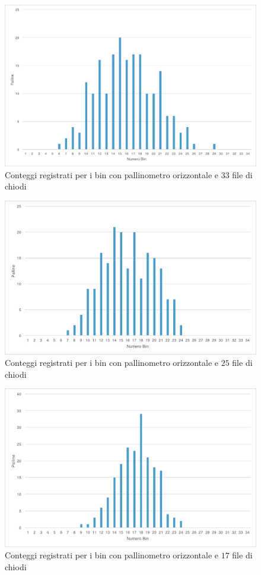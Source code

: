 \documentclass[10pt,oneside,a4paper]{article}
\begin{document}
\begin{figure}[H]
\caption{Conteggi registrati per i bin con pallinometro orizzontale e $33$ file di chiodi}
\label{fig:palli_orizzontale_33}
\centering
\includegraphics[scale=0.5]{pallinometro_dritto_foro1.png}
\end{figure}
\begin{figure}[H]
\caption{Conteggi registrati per i bin con pallinometro orizzontale e $25$ file di chiodi}
\label{fig:palli_orizzontale_25}
\centering
\includegraphics[scale=0.55]{pallinometro_dritto_foro2.png}
\end{figure}
\begin{figure}[H]
\caption{Conteggi registrati per i bin con pallinometro orizzontale e $17$ file di chiodi}
\label{fig:palli_orizzontale_17}
\centering
\includegraphics[scale=0.59]{pallinometro_dritto_foro3.png}
\end{figure}
\end{document}

